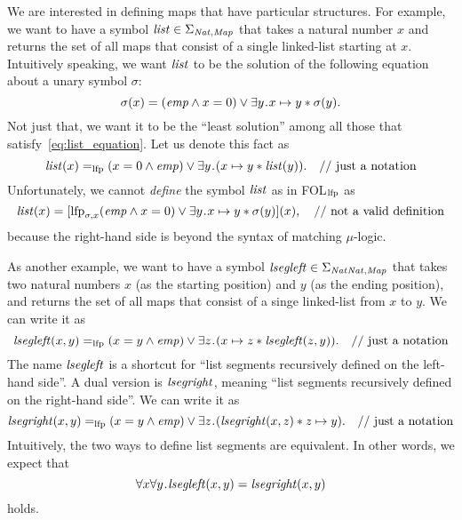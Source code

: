 \documentclass{amsart}
\begin{document}
We are interested in defining maps that have particular structures.
For example, we want to have a symbol $\mathit{list} \in \Sigma_{\mathit{Nat},\mathit{Map}}$
that takes a natural number $x$ and returns the set of all maps
that consist of a single linked-list starting at $x$.
Intuitively speaking, we want $\mathit{list}$ to be the solution
of the following equation about a unary symbol $\sigma$:
\begin{equation}
\label{eq:list_equation}
\sigma(x) = 
(\mathit{emp} \wedge x = 0) \vee \exists y \mathbin{\!.\!} x \mapsto y \mathbin{*} \sigma(y).
\end{equation}
Not just that, we want it to be the ``least solution'' among all those
that satisfy~\eqref{eq:list_equation}.
Let us denote this fact as
\begin{equation}
\label{eq:list_lfp_definition}
\listit(x) =_\lfp (x = 0 \wedge \emp) \vee \exists y \ldot 
(x \mapsto y \merge \listit(y)).
\quad \text{\doubleslash just a notation}
\end{equation}
Unfortunately, we cannot \emph{define} the symbol $\mathit{list}$ as
in FOL$_{\mathrm{lfp}}$ as
\begin{equation}
\label{eq:list_lfp_binder}
\listit(x) =
[\lfp_{\sigma,x}  
(\emp \wedge x = 0) \vee \exists y \ldot x \mapsto y \merge \sigma(y)](x),
\quad \text{\doubleslash not a valid definition}
\end{equation}
because the right-hand side is beyond the syntax of matching $\mu$-logic.

As another example, we want to have a symbol 
$\mathit{ls\hspace{-0.02em}e\hspace{-0.04em}gleft} \in \Sigma_{\mathit{Nat}\mathit{Nat},\mathit{Map}}$
that takes two natural numbers $x$ (as the starting position)
and $y$ (as the ending position), 
and returns the set of all maps that consist of a singe linked-list
from $x$ to $y$.
We can write it as
\begin{equation}
\label{eq:lsegleft_lfp_definition}
\lsegleft(x,y) =_\lfp (x = y \wedge \emp) \vee 
\exists z \ldot 
(x \mapsto z \merge \lsegleft(z,y)).
\quad \text{\doubleslash just a notation}
\end{equation}
The name $\mathit{ls\hspace{-0.02em}e\hspace{-0.04em}gleft}$ is a shortcut for
``list segments recursively defined on the left-hand side''.
A dual version is $\mathit{ls\hspace{-0.02em}e\hspace{-0.04em}gright}$, meaning
``list segments recursively defined on the right-hand side''.
We can write it as
\begin{equation}
\label{eq:lsegright_lfp_definition}
\lsegright(x,y) =_\lfp (x = y \wedge \emp) \vee 
\exists z \ldot 
(\lsegright(x,z) \merge z \mapsto y).
\quad \text{\doubleslash just a notation}
\end{equation}
Intuitively, the two ways to define list segments are equivalent.
In other words, we expect that
\begin{equation}
\label{eq:lsegleft_implies_lsegright}
\forall x \forall y \mathbin{\!.\!} \mathit{ls\hspace{-0.02em}e\hspace{-0.04em}gleft}(x,y) = \mathit{ls\hspace{-0.02em}e\hspace{-0.04em}gright}(x,y)
\end{equation}
holds.
\end{document}
